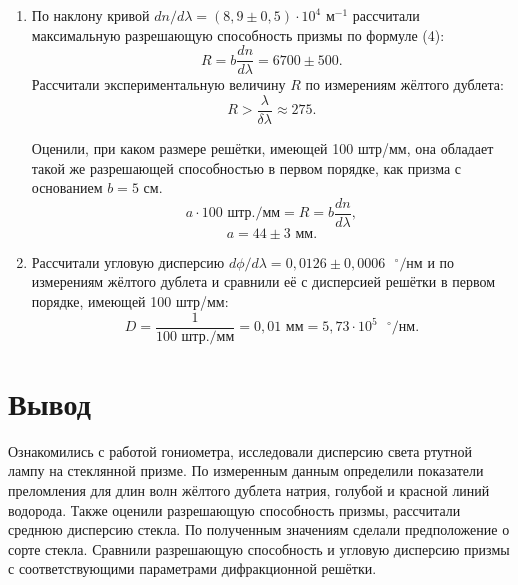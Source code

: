 \documentclass[a4paper,12pt]{article}
\begin{document}
\begin{enumerate}
\begin{figure}[h]
\begin{center}
	 	\end{center}
	 \end{figure}
	\item По наклону кривой $dn/d\lambda = (8{,}9\pm0{,}5)\cdot10^{4}\text{ м}^{-1
	}$  рассчитали максимальную разрешающую способность призмы по формуле (4):
	\begin{equation*}
	R = b\dfrac{dn}{d\lambda} = 6700\pm500.
	\end{equation*}
	Рассчитали экспериментальную величину $R$ по измерениям жёлтого дублета:
	\begin{equation*}
	R > \dfrac{\lambda}{\delta\lambda} \approx 275.
	\end{equation*}
	
	Оценили, при каком размере решётки, имеющей 100 штр/мм, она обладает такой же разрешающей способностью в первом порядке, как призма с основанием $b = 5$ см.
	\begin{equation*}
	a\cdot100\text{ штр./мм} = R = b\dfrac{dn}{d\lambda},
	\end{equation*}
	\begin{equation*}
	a = 44\pm3 \text{ мм}.
	\end{equation*}
	\item Рассчитали угловую дисперсию $d\phi/d\lambda = 0{,}0126\pm0{,}0006\text{ }^\circ\text{/нм}$ и по измерениям жёлтого дублета и сравнили её с дисперсией решётки в первом порядке, имеющей 100 штр/мм:
	\begin{equation*}
	D = \dfrac{1}{100\text{ штр./мм}} = 0{,}01\text{ мм} = 5{,}73\cdot10^5\text{ }^\circ\text{/нм}.
	\end{equation*}
\end{enumerate}

\section*{Вывод}
Ознакомились с работой гониометра, исследовали дисперсию света ртутной лампу на стеклянной призме. По измеренным данным определили показатели преломления для длин волн жёлтого дублета натрия, голубой и красной линий водорода. Также оценили разрешающую способность призмы, рассчитали среднюю дисперсию стекла. По полученным значениям сделали предположение о сорте стекла. Сравнили разрешающую способность и угловую дисперсию призмы с соответствующими параметрами дифракционной решётки.
\end{document}
